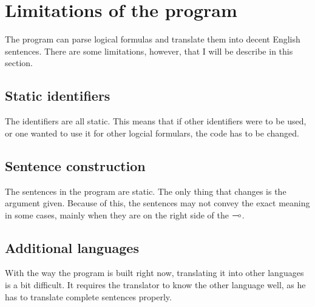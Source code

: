 \section{Limitations of the program}
\label{04_04}

The program can parse logical formulas and translate them into decent English sentences. There are some limitations, however, that I will be describe in this section.

\subsection{Static identifiers}
\label{04_04_01}

The identifiers are all static. This means that if other identifiers were to be used, or one wanted to use it for other logcial formulars, the code has to be changed. 

\subsection{Sentence construction}
\label{04_04_02}

The sentences in the program are static. The only thing that changes is the argument given. Because of this, the sentences may not convey the exact meaning in some cases, mainly when they are on the right side of the $\multimap$. 

\subsection{Additional languages}
\label{04_04_03}

With the way the program is built right now, translating it into other languages is a bit difficult. It requires the translator to know the other language well, as he has to translate complete sentences properly. 